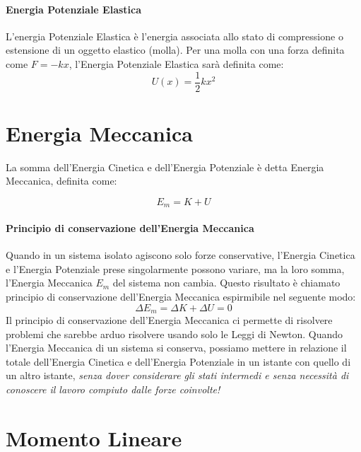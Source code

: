         \paragraph{Energia Potenziale Elastica} L'energia Potenziale Elastica è 
        l'energia associata allo stato di compressione o estensione di un 
        oggetto elastico (molla). Per una molla con una forza definita come 
        $ F = -kx $, l'Energia Potenziale Elastica sarà definita come:
        \begin{equation}
            U(x)     = \frac{1}{2}kx^2
        \end{equation}

    \section{Energia Meccanica} La somma dell'Energia Cinetica e dell'Energia
    Potenziale è detta Energia Meccanica, definita come:

        \begin{equation}
            E_m = K + U
        \end{equation}

        \paragraph{Principio di conservazione dell'Energia Meccanica} Quando in 
        un sistema isolato agiscono solo forze conservative, l'Energia Cinetica 
        e l'Energia Potenziale prese singolarmente possono variare, ma la loro
        somma, l'Energia Meccanica $E_m$ del sistema non cambia. Questo 
        risultato è chiamato principio di conservazione dell'Energia Meccanica
        espirmibile nel seguente modo:
        \begin{equation}
            \Delta E_m = \Delta K + \Delta U = 0
        \end{equation}
        Il principio di conservazione dell'Energia Meccanica ci permette di 
        risolvere problemi che sarebbe arduo risolvere usando solo le Leggi di 
        Newton.
        Quando l'Energia Meccanica di un sistema si conserva, possiamo mettere
        in relazione il totale dell'Energia Cinetica e dell'Energia Potenziale
        in un istante con quello di un altro istante, \textit{senza dover
        considerare gli stati intermedi e senza necessità di conoscere il lavoro
        compiuto dalle forze coinvolte!}

        
    \section{Momento Lineare}


